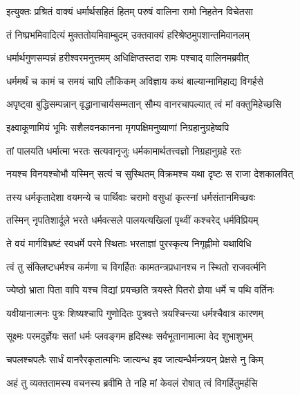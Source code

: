 
\twolineshloka
{इत्युक्तः प्रश्रितं वाक्यं धर्मार्थसहितं हितम्}
{परुषं वालिना रामो निहतेन विचेतसा} %

\twolineshloka
{तं निष्प्रभमिवादित्यं मुक्ततोयमिवाम्बुदम्}
{उक्तवाक्यं हरिश्रेष्ठमुपशान्तमिवानलम्} %

\twolineshloka
{धर्मार्थगुणसम्पन्नं हरीश्वरमनुत्तमम्}
{अधिक्षिप्तस्तदा रामः पश्चाद् वालिनमब्रवीत्} %

\twolineshloka
{धर्ममर्थं च कामं च समयं चापि लौकिकम्}
{अविज्ञाय कथं बाल्यान्मामिहाद्य विगर्हसे} %

\twolineshloka
{अपृष्ट्वा बुद्धिसम्पन्नान् वृद्धानाचार्यसम्मतान्}
{सौम्य वानरचापल्यात् त्वं मां वक्तुमिहेच्छसि} %

\twolineshloka
{इक्ष्वाकूणामियं भूमिः सशैलवनकानना}
{मृगपक्षिमनुष्याणां निग्रहानुग्रहेष्वपि} %

\twolineshloka
{तां पालयति धर्मात्मा भरतः सत्यवानृजुः}
{धर्मकामार्थतत्त्वज्ञो निग्रहानुग्रहे रतः} %

\twolineshloka
{नयश्च विनयश्चोभौ यस्मिन् सत्यं च सुस्थितम्}
{विक्रमश्च यथा दृष्टः स राजा देशकालवित्} %

\twolineshloka
{तस्य धर्मकृतादेशा वयमन्ये च पार्थिवाः}
{चरामो वसुधां कृत्स्नां धर्मसंतानमिच्छवः} %

\twolineshloka
{तस्मिन् नृपतिशार्दूले भरते धर्मवत्सले}
{पालयत्यखिलां पृथ्वीं कश्चरेद् धर्मविप्रियम्} %

\twolineshloka
{ते वयं मार्गविभ्रष्टं स्वधर्मे परमे स्थिताः}
{भरताज्ञां पुरस्कृत्य निगृह्णीमो यथाविधि} %

\twolineshloka
{त्वं तु संक्लिष्टधर्मश्च कर्मणा च विगर्हितः}
{कामतन्त्रप्रधानश्च न स्थितो राजवर्त्मनि} %

\twolineshloka
{ज्येष्ठो भ्राता पिता वापि यश्च विद्यां प्रयच्छति}
{त्रयस्ते पितरो ज्ञेया धर्मे च पथि वर्तिनः} %

\twolineshloka
{यवीयानात्मनः पुत्रः शिष्यश्चापि गुणोदितः}
{पुत्रवत्ते त्रयश्चिन्त्या धर्मश्चैवात्र कारणम्} %

\twolineshloka
{सूक्ष्मः परमदुर्ज्ञेयः सतां धर्मः प्लवङ्गम}
{हृदिस्थः सर्वभूतानामात्मा वेद शुभाशुभम्} %

\twolineshloka
{चपलश्चपलैः सार्धं वानरैरकृतात्मभिः}
{जात्यन्ध इव जात्यन्धैर्मन्त्रयन् प्रेक्षसे नु किम्} %

\twolineshloka
{अहं तु व्यक्ततामस्य वचनस्य ब्रवीमि ते}
{नहि मां केवलं रोषात् त्वं विगर्हितुमर्हसि} %

